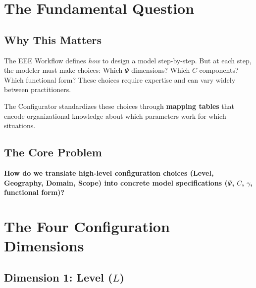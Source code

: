 
\section{The Fundamental Question}
\label{sec:ggg-fundamental}

\subsection{Why This Matters}

The EEE Workflow defines \textit{how} to design a model step-by-step. But at each
step, the modeler must make choices: Which $\Psi$ dimensions? Which $C$ components?
Which functional form? These choices require expertise and can vary widely between
practitioners.

The Configurator standardizes these choices through \textbf{mapping tables} that
encode organizational knowledge about which parameters work for which situations.

\subsection{The Core Problem}

\begin{tcolorbox}[colback=red!5!white, colframe=red!75!black,
    title=The Fundamental Question]
\textbf{How do we translate high-level configuration choices (Level, Geography,
Domain, Scope) into concrete model specifications ($\Psi$, $C$, $\gamma$, functional form)?}
\end{tcolorbox}


\section{The Four Configuration Dimensions}
\label{sec:ggg-dimensions}

\subsection{Dimension 1: Level ($L$)}

